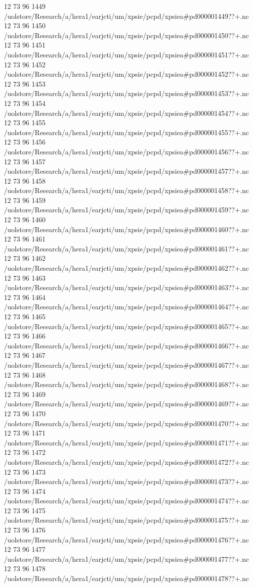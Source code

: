 12 73 96
1449
/uolstore/Research/a/hera1/earjcti/um/xpsie/pcpd/xpsiea#pd000001449??+.nc
12 73 96
1450
/uolstore/Research/a/hera1/earjcti/um/xpsie/pcpd/xpsiea#pd000001450??+.nc
12 73 96
1451
/uolstore/Research/a/hera1/earjcti/um/xpsie/pcpd/xpsiea#pd000001451??+.nc
12 73 96
1452
/uolstore/Research/a/hera1/earjcti/um/xpsie/pcpd/xpsiea#pd000001452??+.nc
12 73 96
1453
/uolstore/Research/a/hera1/earjcti/um/xpsie/pcpd/xpsiea#pd000001453??+.nc
12 73 96
1454
/uolstore/Research/a/hera1/earjcti/um/xpsie/pcpd/xpsiea#pd000001454??+.nc
12 73 96
1455
/uolstore/Research/a/hera1/earjcti/um/xpsie/pcpd/xpsiea#pd000001455??+.nc
12 73 96
1456
/uolstore/Research/a/hera1/earjcti/um/xpsie/pcpd/xpsiea#pd000001456??+.nc
12 73 96
1457
/uolstore/Research/a/hera1/earjcti/um/xpsie/pcpd/xpsiea#pd000001457??+.nc
12 73 96
1458
/uolstore/Research/a/hera1/earjcti/um/xpsie/pcpd/xpsiea#pd000001458??+.nc
12 73 96
1459
/uolstore/Research/a/hera1/earjcti/um/xpsie/pcpd/xpsiea#pd000001459??+.nc
12 73 96
1460
/uolstore/Research/a/hera1/earjcti/um/xpsie/pcpd/xpsiea#pd000001460??+.nc
12 73 96
1461
/uolstore/Research/a/hera1/earjcti/um/xpsie/pcpd/xpsiea#pd000001461??+.nc
12 73 96
1462
/uolstore/Research/a/hera1/earjcti/um/xpsie/pcpd/xpsiea#pd000001462??+.nc
12 73 96
1463
/uolstore/Research/a/hera1/earjcti/um/xpsie/pcpd/xpsiea#pd000001463??+.nc
12 73 96
1464
/uolstore/Research/a/hera1/earjcti/um/xpsie/pcpd/xpsiea#pd000001464??+.nc
12 73 96
1465
/uolstore/Research/a/hera1/earjcti/um/xpsie/pcpd/xpsiea#pd000001465??+.nc
12 73 96
1466
/uolstore/Research/a/hera1/earjcti/um/xpsie/pcpd/xpsiea#pd000001466??+.nc
12 73 96
1467
/uolstore/Research/a/hera1/earjcti/um/xpsie/pcpd/xpsiea#pd000001467??+.nc
12 73 96
1468
/uolstore/Research/a/hera1/earjcti/um/xpsie/pcpd/xpsiea#pd000001468??+.nc
12 73 96
1469
/uolstore/Research/a/hera1/earjcti/um/xpsie/pcpd/xpsiea#pd000001469??+.nc
12 73 96
1470
/uolstore/Research/a/hera1/earjcti/um/xpsie/pcpd/xpsiea#pd000001470??+.nc
12 73 96
1471
/uolstore/Research/a/hera1/earjcti/um/xpsie/pcpd/xpsiea#pd000001471??+.nc
12 73 96
1472
/uolstore/Research/a/hera1/earjcti/um/xpsie/pcpd/xpsiea#pd000001472??+.nc
12 73 96
1473
/uolstore/Research/a/hera1/earjcti/um/xpsie/pcpd/xpsiea#pd000001473??+.nc
12 73 96
1474
/uolstore/Research/a/hera1/earjcti/um/xpsie/pcpd/xpsiea#pd000001474??+.nc
12 73 96
1475
/uolstore/Research/a/hera1/earjcti/um/xpsie/pcpd/xpsiea#pd000001475??+.nc
12 73 96
1476
/uolstore/Research/a/hera1/earjcti/um/xpsie/pcpd/xpsiea#pd000001476??+.nc
12 73 96
1477
/uolstore/Research/a/hera1/earjcti/um/xpsie/pcpd/xpsiea#pd000001477??+.nc
12 73 96
1478
/uolstore/Research/a/hera1/earjcti/um/xpsie/pcpd/xpsiea#pd000001478??+.nc
